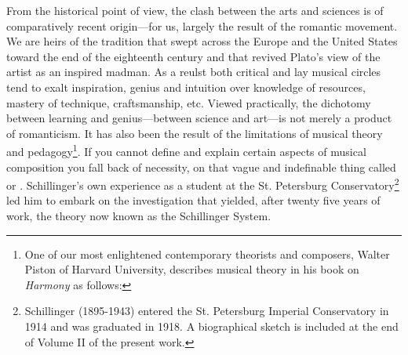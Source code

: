 From the historical point of view, the clash between the arts and sciences is
of comparatively recent origin---for us, largely the result of the romantic
movement. We are heirs of the tradition that swept across the Europe and the
United States toward the end of the eighteenth century and that revived Plato's
view of the artist as an inspired madman. As a reulst both critical and lay
musical circles tend to exalt inspiration, genius and intuition over knowledge
of resources, mastery of technique, craftsmanship, etc. Viewed practically, the
dichotomy between learning and genius---between science and art---is not merely
a product of romanticism. It has also been the result of the limitations of
musical theory and pedagogy\footnote{One of our most enlightened contemporary
theorists and composers, Walter Piston of Harvard University, describes musical
theory in his book on \textit{Harmony} as follows: }. If you cannot define and
explain certain aspects of musical composition you fall back of necessity, on
that vague and indefinable thing called  or .
Schillinger's own experience as a student at the St. Petersburg
Conservatory\footnote{Schillinger (1895-1943) entered the St. Petersburg
Imperial Conservatory in 1914 and was graduated in 1918. A biographical sketch
is included at the end of Volume II of the present work.} led him to embark on
the investigation that yielded, after twenty five years of work, the theory now
known as the Schillinger System.

